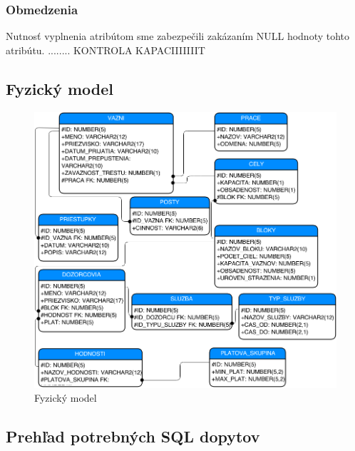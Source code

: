 \documentclass[slovak, 12pt, Times New Roman]{article}
\begin{document}
			\subsubsection{Obmedzenia}
				Nutnosť vyplnenia atribútom sme zabezpečili zakázaním NULL hodnoty tohto atribútu. 
				........ KONTROLA KAPACIIIIIIIT
				\clearpage
		\subsection{Fyzický model}
			\begin{figure}[!htb]
				\centering
				\includegraphics[scale=0.6]{fyzDia.png}
				\caption{Fyzický model}
				\label{fig:Reinforcement}
			\end{figure}
			\clearpage
		\subsection{Prehľad potrebných SQL dopytov}
\end{document}
